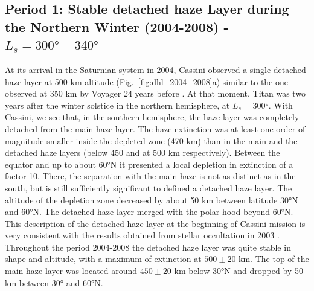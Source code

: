 \subsection{Period 1: Stable detached haze Layer during the Northern Winter (2004-2008) - $L_s=\ang{300}-\ang{340}$}

At its arrival in the Saturnian system in 2004, Cassini observed a single detached haze layer at 500 km altitude 
(Fig.~\ref{fig:dhl_2004_2008}a) similar to the one observed at 350 km by Voyager 24 years before
\citep{Smith1981}. At that moment, Titan was two years after the winter solstice in the northern hemisphere, at $L_s=\ang{300}$.
With Cassini, we see that, in the southern hemisphere, the haze layer was completely detached from the main haze layer.
The haze extinction was at least one order of magnitude smaller inside the depleted zone (470 km) than in the main and
the detached haze layers (below 450 and at 500 km respectively).
Between the equator and up to about \ang{60}N it presented a local depletion in extinction
of a factor 10. There, the separation with the main haze is not as distinct as in the south, but is still sufficiently significant to
defined a detached haze layer.
The altitude of the depletion zone decreased by about 50 km between latitude \ang{30}N  and \ang{60}N.
The detached haze layer merged with the polar hood beyond \ang{60}N. This description of the detached haze layer at
the beginning of Cassini mission is very consistent with the results obtained from stellar occultation in 2003 \citep{Sicardy2006}.
Throughout the period 2004-2008 the detached haze layer was quite stable in shape and  altitude, with a maximum of extinction
at $500 \pm 20$ km. The top of the main haze layer was located around $450 \pm 20$ km below \ang{30}N and dropped
by 50 km between \ang{30} and \ang{60}N.

